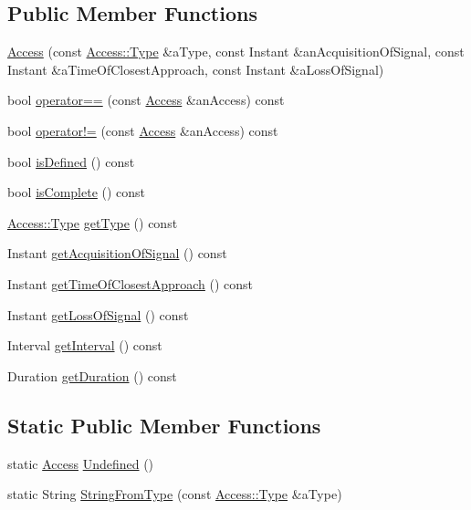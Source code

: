 \subsection*{Public Member Functions}
\begin{DoxyCompactItemize}
\item 
\hyperlink{classostk_1_1astro_1_1_access_ace88d61843a4e38c39432a39e2864b04}{Access} (const \hyperlink{classostk_1_1astro_1_1_access_aac00b1a6ead7db92eba5b71e43235c93}{Access\+::\+Type} \&a\+Type, const Instant \&an\+Acquisition\+Of\+Signal, const Instant \&a\+Time\+Of\+Closest\+Approach, const Instant \&a\+Loss\+Of\+Signal)
\item 
bool \hyperlink{classostk_1_1astro_1_1_access_a4e336578930e1e1d49b7bdc279af4bdf}{operator==} (const \hyperlink{classostk_1_1astro_1_1_access}{Access} \&an\+Access) const
\item 
bool \hyperlink{classostk_1_1astro_1_1_access_a054593ffe0556b14c3eab0dd3ebcca56}{operator!=} (const \hyperlink{classostk_1_1astro_1_1_access}{Access} \&an\+Access) const
\item 
bool \hyperlink{classostk_1_1astro_1_1_access_adecb227a516bed14ad9f11b9b36ba48e}{is\+Defined} () const
\item 
bool \hyperlink{classostk_1_1astro_1_1_access_ae6bfc3c40d23545d9c520e44550c5033}{is\+Complete} () const
\item 
\hyperlink{classostk_1_1astro_1_1_access_aac00b1a6ead7db92eba5b71e43235c93}{Access\+::\+Type} \hyperlink{classostk_1_1astro_1_1_access_aa88d0d19a9386b9748f87263289195a2}{get\+Type} () const
\item 
Instant \hyperlink{classostk_1_1astro_1_1_access_a07b36c41b6ecceab9d841197e6e412d2}{get\+Acquisition\+Of\+Signal} () const
\item 
Instant \hyperlink{classostk_1_1astro_1_1_access_aa5be394928873c5795cfb068b1e5bfb6}{get\+Time\+Of\+Closest\+Approach} () const
\item 
Instant \hyperlink{classostk_1_1astro_1_1_access_ace680122654f24704fb6a40631b84afb}{get\+Loss\+Of\+Signal} () const
\item 
Interval \hyperlink{classostk_1_1astro_1_1_access_a44d8162ed0ea9bd599fe351639364ee0}{get\+Interval} () const
\item 
Duration \hyperlink{classostk_1_1astro_1_1_access_afb542654ea7603d54773e612be071bc2}{get\+Duration} () const
\end{DoxyCompactItemize}
\subsection*{Static Public Member Functions}
\begin{DoxyCompactItemize}
\item 
static \hyperlink{classostk_1_1astro_1_1_access}{Access} \hyperlink{classostk_1_1astro_1_1_access_aa7770be15907d9dabc3ae9a9490e9bad}{Undefined} ()
\item 
static String \hyperlink{classostk_1_1astro_1_1_access_ada64e6a55fe3505b548bdb2651f122e3}{String\+From\+Type} (const \hyperlink{classostk_1_1astro_1_1_access_aac00b1a6ead7db92eba5b71e43235c93}{Access\+::\+Type} \&a\+Type)
\end{DoxyCompactItemize}
